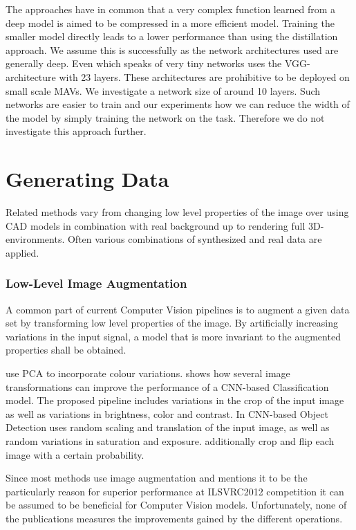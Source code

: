 The approaches have in common that a very complex function learned from a deep model is aimed to be compressed in a more efficient model. Training the smaller model directly leads to a lower performance than using the distillation approach. We assume this is successfully as the network architectures used are generally deep. Even \cite{Wei2018a} which speaks of very tiny networks uses the VGG-architecture with 23 layers. These architectures are prohibitive to be deployed on small scale \acp{MAV}. We investigate a network size of around 10 layers. Such networks are easier to train and our experiments how we can reduce the width of the model by simply training the network on the task. Therefore we do not investigate this approach further.

\section{Generating Data}
\label{sec:training:related}

Related methods vary from changing low level properties of the image over using CAD models in combination with real background up to rendering full 3D-environments. Often various combinations of synthesized and real data are applied. 

\subsubsection{Low-Level Image Augmentation}

A common part of current Computer Vision pipelines is to augment a given data set by transforming low level properties of the image. By artificially increasing variations in the input signal, a model that is more invariant to the augmented properties shall be obtained.

\citeauthor{Krizhevsky2012a} \cite{Krizhevsky2012a} use \ac{PCA} to incorporate colour variations. \citeauthor{Howard2013} \cite{Howard2013} shows how several image transformations can improve the performance of a \ac{CNN}-based Classification model. The proposed pipeline includes variations in the crop of the input image as well as variations in brightness, color and contrast. In \ac{CNN}-based Object Detection \citeauthor{Redmon} \cite{Redmon} uses random scaling and translation of the input image, as well as random variations in saturation and exposure. \citeauthor{Liu} \cite{Liu} additionally crop and flip each image with a certain probability.

Since most methods use image augmentation and \citeauthor{Krizhevsky2012a} \cite{Krizhevsky2012a} mentions it to be the particularly reason for superior performance at ILSVRC2012 competition it can be assumed to be beneficial for Computer Vision models. Unfortunately, none of the publications measures the improvements gained by the different operations. 

